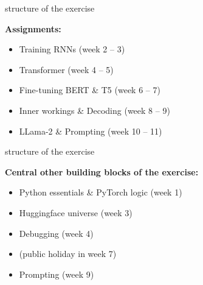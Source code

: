 \documentclass[11pt,compress,t,notes=noshow, xcolor=table]{beamer}
\begin{document}

\begin{frame}{structure of the exercise}

\vfill

\textbf{Assignments:}

	\begin{itemize}
		\item Training RNNs (week 2 -- 3)
		\item Transformer (week 4 -- 5)
		\item Fine-tuning BERT \& T5 (week 6 -- 7)
		\item Inner workings \& Decoding (week 8 -- 9)
		\item LLama-2 \& Prompting (week 10 -- 11)
	\end{itemize}

\vfill

\end{frame}


\begin{frame}{structure of the exercise}

\vfill

\textbf{Central other building blocks of the exercise:}

	\begin{itemize}
		\item Python essentials \& PyTorch logic (week 1)
		\item Huggingface universe (week 3)
		\item Debugging (week 4)
		\item (public holiday in week 7)
		\item Prompting (week 9)
	\end{itemize}

\vfill

\end{frame}

\end{document}
